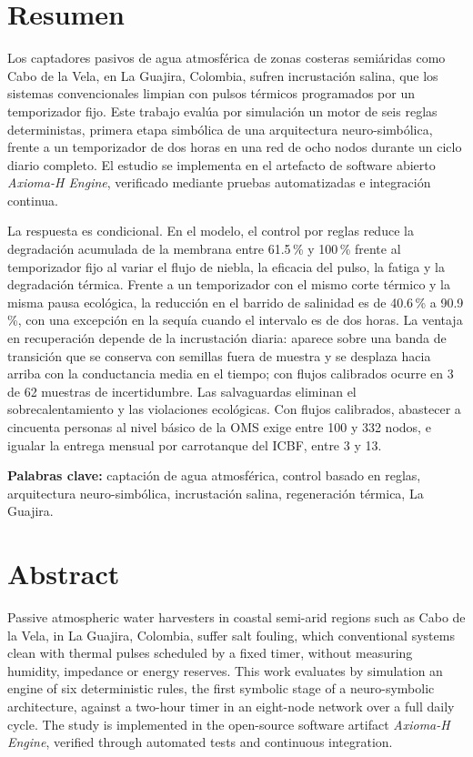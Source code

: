 \chapter*{Resumen}

Los captadores pasivos de agua atmosf\'erica de zonas costeras semi\'aridas como Cabo de la Vela, en La Guajira, Colombia, sufren incrustaci\'on salina, que los sistemas convencionales limpian con pulsos t\'ermicos programados por un temporizador fijo. Este trabajo eval\'ua por simulaci\'on un motor de seis reglas deterministas, primera etapa simb\'olica de una arquitectura neuro-simb\'olica, frente a un temporizador de dos horas en una red de ocho nodos durante un ciclo diario completo. El estudio se implementa en el artefacto de software abierto \emph{Axioma-H Engine}, verificado mediante pruebas automatizadas e integraci\'on continua.

La respuesta es condicional. En el modelo, el control por reglas reduce la degradaci\'on acumulada de la membrana entre 61.5\,\% y 100\,\% frente al temporizador fijo al variar el flujo de niebla, la eficacia del pulso, la fatiga y la degradaci\'on t\'ermica. Frente a un temporizador con el mismo corte t\'ermico y la misma pausa ecol\'ogica, la reducci\'on en el barrido de salinidad es de 40.6\,\% a 90.9\,\%, con una excepci\'on en la sequ\'ia cuando el intervalo es de dos horas. La ventaja en recuperaci\'on depende de la incrustaci\'on diaria: aparece sobre una banda de transici\'on que se conserva con semillas fuera de muestra y se desplaza hacia arriba con la conductancia media en el tiempo; con flujos calibrados ocurre en 3 de 62 muestras de incertidumbre. Las salvaguardas eliminan el sobrecalentamiento y las violaciones ecol\'ogicas. Con flujos calibrados, abastecer a cincuenta personas al nivel b\'asico de la OMS exige entre 100 y 332 nodos, e igualar la entrega mensual por carrotanque del ICBF, entre 3 y 13.

\medskip
\noindent\textbf{Palabras clave:} captaci\'on de agua atmosf\'erica, control basado en reglas, arquitectura neuro-simb\'olica, incrustaci\'on salina, regeneraci\'on t\'ermica, La Guajira.

\chapter*{Abstract}

Passive atmospheric water harvesters in coastal semi-arid regions such as Cabo de la Vela, in La Guajira, Colombia, suffer salt fouling, which conventional systems clean with thermal pulses scheduled by a fixed timer, without measuring humidity, impedance or energy reserves. This work evaluates by simulation an engine of six deterministic rules, the first symbolic stage of a neuro-symbolic architecture, against a two-hour timer in an eight-node network over a full daily cycle. The study is implemented in the open-source software artifact \emph{Axioma-H Engine}, verified through automated tests and continuous integration.

